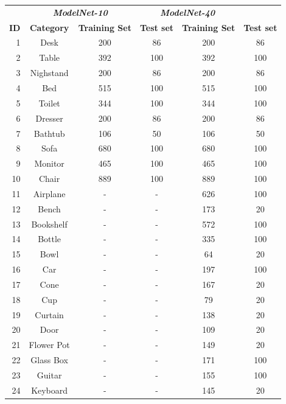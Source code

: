 \clearpage

\begin{table}
    \centering
    \begin{tabular}{rccccc}
    &	\multicolumn{2}{c}{\textbf{\emph{ModelNet-10}}} & \multicolumn{2}{c}{\textbf{\emph{ModelNet-40}}}\\
    \textbf{ID} & \textbf{Category}  & \textbf{Training Set} & \textbf{Test set} & \textbf{Training Set} & \textbf{Test set} \\
    \toprule
    1 & Desk      & 200        & 86		& 200  & 86     \\
    2 & Table     & 392        & 100    & 392  & 100	\\
    3 & Nighstand & 200        & 86     & 200  & 86		\\
    4 & Bed       & 515        & 100    & 515  & 100	\\
    5 & Toilet    & 344        & 100    & 344  & 100	\\
    6 & Dresser   & 200        & 86     & 200  & 86		\\
    7 & Bathtub   & 106        & 50     & 106  & 50		\\
    8 & Sofa      & 680        & 100    & 680  & 100	\\
    9 & Monitor   & 465        & 100    & 465  & 100 	\\
    10 & Chair     & 889        & 100    & 889  & 100	\\
    11 & Airplane  & -	 & -	 & 626	& 100 \\
    12 & Bench	  & -	 & -	 & 173	& 20 \\
    13 & Bookshelf & -	 & -	 & 572	& 100 \\
    14 & Bottle	  & -	 & -	 & 335	& 100 \\
    15 & Bowl	  & -	 & -	 & 64	& 20 \\
    16 & Car		  & -	 & -	 & 197	& 100 \\
    17 & Cone	  & -	 & -	 & 167	& 20 \\
    18 & Cup		  & -	 & -	 & 79	& 20 \\
    19 & Curtain	  & -	 & -	 & 138	& 20 \\
    20 & Door	  & -	 & -	 & 109	& 20 \\
    21 & Flower Pot & -	 & -	 & 149	& 20 \\
    22 & Glass Box & -	 & -	 & 171	& 100 \\
    23 & Guitar	  & -	 & -	 & 155	& 100 \\
    24 & Keyboard  & -	 & -	 & 145	& 20 \\

\end{tabular}
\end{table}
